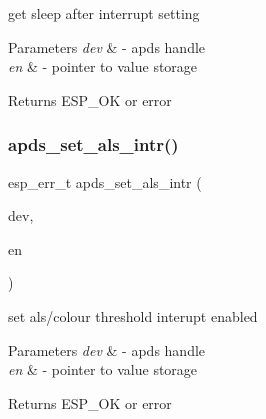 \begin{DoxyItemize}
\item get sleep after interrupt setting 
\end{DoxyItemize}


\begin{DoxyParams}{Parameters}
{\em dev} & -\/ apds handle \\
\hline
{\em en} & -\/ pointer to value storage \\
\hline
\end{DoxyParams}
\begin{DoxyReturn}{Returns}
E\+S\+P\+\_\+\+OK or error 
\end{DoxyReturn}
\mbox{\label{group__APDS9960__InterruptFunctions_gae68b39659be80fdb9dcda0b89c98713b}} 
\subsubsection{\texorpdfstring{apds\+\_\+set\+\_\+als\+\_\+intr()}{apds\_set\_als\_intr()}}
{\footnotesize\ttfamily esp\+\_\+err\+\_\+t apds\+\_\+set\+\_\+als\+\_\+intr (\begin{DoxyParamCaption}\item[{\hyperlink{structAPDS9960__Driver}{A\+P\+D\+S\+\_\+\+D\+EV}}]{dev,  }\item[{\hyperlink{vl53l0x__types_8h_aba7bc1797add20fe3efdf37ced1182c5}{uint8\+\_\+t} $\ast$}]{en }\end{DoxyParamCaption})}




\begin{DoxyItemize}
\item set als/colour threshold interupt enabled 
\end{DoxyItemize}


\begin{DoxyParams}{Parameters}
{\em dev} & -\/ apds handle \\
\hline
{\em en} & -\/ pointer to value storage \\
\hline
\end{DoxyParams}
\begin{DoxyReturn}{Returns}
E\+S\+P\+\_\+\+OK or error 
\end{DoxyReturn}
\mbox{\label{group__APDS9960__InterruptFunctions_ga11d5a6ed6e4ee037e4b7fac9098e31c8}} 
